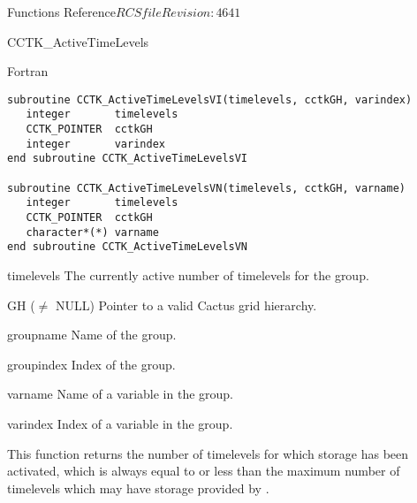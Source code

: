 \begin{cactuspart}{ Functions Reference}{$RCSfile$}{$Revision: 4641 $}
\begin{FunctionDescription}{CCTK\_ActiveTimeLevels}
\begin{SynopsisSection}
\begin{Synopsis}{Fortran}
\begin{verbatim}
subroutine CCTK_ActiveTimeLevelsVI(timelevels, cctkGH, varindex)
   integer       timelevels
   CCTK_POINTER  cctkGH
   integer       varindex
end subroutine CCTK_ActiveTimeLevelsVI

subroutine CCTK_ActiveTimeLevelsVN(timelevels, cctkGH, varname)
   integer       timelevels
   CCTK_POINTER  cctkGH
   character*(*) varname
end subroutine CCTK_ActiveTimeLevelsVN
\end{verbatim}
\end{Synopsis}
\end{SynopsisSection}

\begin{ResultSection}
\begin{Result}{timelevels}
The currently active number of timelevels for the group.
\end{Result}
\end{ResultSection}

\begin{ParameterSection}
\begin{Parameter}{GH ($\ne$ NULL)}
Pointer to a valid Cactus grid hierarchy.
\end{Parameter}
\begin{Parameter}{groupname}
Name of the group.
\end{Parameter}
\begin{Parameter}{groupindex}
Index of the group.
\end{Parameter}
\begin{Parameter}{varname}
Name of a variable in the group.
\end{Parameter}
\begin{Parameter}{varindex}
Index of a variable in the group.
\end{Parameter}
\end{ParameterSection}

\begin{Discussion}
This function returns the number of timelevels for which storage has
been activated, which is always equal to or less than the maximum
number of timelevels which may have storage provided by
.
\end{Discussion}


\end{FunctionDescription}
\end{cactuspart}
